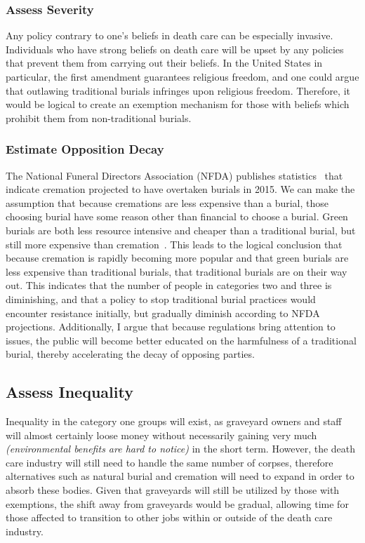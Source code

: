 \documentclass[a4paper,12pt]{article}
\begin{document}
\subsubsection{Assess Severity}
Any policy contrary to one's beliefs in death care can be especially invasive.
Individuals who have strong beliefs on death care will be upset by any policies that prevent them from carrying out their beliefs.
In the United States in particular, the first amendment guarantees religious freedom, and one could argue that outlawing traditional burials infringes upon religious freedom.
Therefore, it would be logical to create an exemption mechanism for those with beliefs which prohibit them from non-traditional burials.

\subsubsection{Estimate Opposition Decay}
The National Funeral Directors Association (NFDA) publishes statistics~\cite{cremationstats} that indicate cremation projected to have overtaken burials in 2015.
We can make the assumption that because cremations are less expensive than a burial, those choosing burial have some reason other than financial to choose a burial.
Green burials are both less resource intensive and cheaper than a traditional burial, but still more expensive than cremation~\cite{johnson_2013}.
This leads to the logical conclusion that because cremation is rapidly becoming more popular and that green burials are less expensive than traditional burials, that traditional burials are on their way out.
This indicates that the number of people in categories two and three is diminishing, and that a policy to stop traditional burial practices would encounter resistance initially, but gradually diminish according to NFDA projections.
Additionally, I argue that because regulations bring attention to issues, the public will become better educated on the harmfulness of a traditional burial, thereby accelerating the decay of opposing parties.

\subsection{Assess Inequality}
Inequality in the category one groups will exist, as graveyard owners and staff will almost certainly loose money without necessarily gaining very much \textit{(environmental benefits are hard to notice)} in the short term.
However, the death care industry will still need to handle the same number of corpses, therefore alternatives such as natural burial and cremation will need to expand in order to absorb these bodies.
Given that graveyards will still be utilized by those with exemptions, the shift away from graveyards would be gradual, allowing time for those affected to transition to other jobs within or outside of the death care industry.
\end{document}
